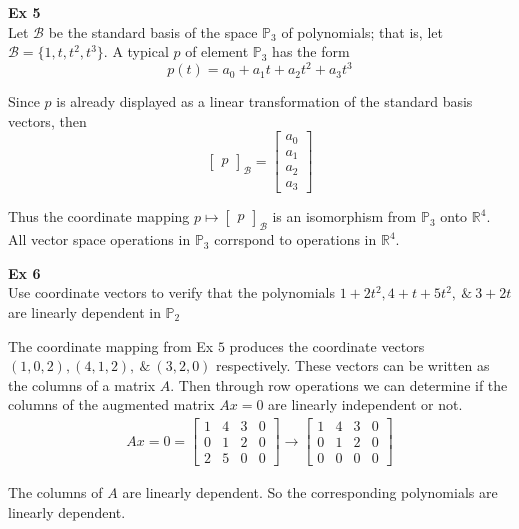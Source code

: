 \documentclass{article}
\begin{document}
   \textbf{Ex 5}\\
   Let $ \mathcal{B} $ be the standard basis of the space $ \mathbb{P}_3 $ of polynomials; that is, let $ \mathcal{B}=\{ 1,t,t^{2},t^{3} \} $. A typical $ p $ of element $ \mathbb{P}_3 $ has the form
   \[
     p(t)=a_0+a_1t+a_2t^{2}+a_3t^{3}
   \]

   Since $ p $ is already displayed as a linear transformation of the standard basis vectors, then
   \[
     \begin{bmatrix}
       p
     \end{bmatrix}_\mathcal{B}=\begin{bmatrix}
       a_0\\
       a_1\\
       a_2\\
       a_3
     \end{bmatrix}
   \]

   Thus the coordinate mapping $ p \mapsto \begin{bmatrix}
     p
   \end{bmatrix}_\mathcal{B} $ is an isomorphism from $ \mathbb{P}_3 $ onto $ \mathbb{R}^{4} $. All vector space operations in $ \mathbb{P}_3 $ corrspond to operations in $ \mathbb{R}^{4} $. 
   
   \textbf{Ex 6}\\
   Use coordinate vectors to verify that the polynomials $ 1+2t^{2},4+t+5t^{2}, ~\&~ 3+2t $ are linearly dependent in $ \mathbb{P}_2 $

   The coordinate mapping from Ex $ 5 $ produces the coordinate vectors $ (1,0,2),(4,1,2), ~\&~ (3,2,0) $ respectively. These vectors can be written as the columns of a matrix $ A $. Then through row operations we can determine if the columns of the augmented matrix $ Ax=0 $  are linearly independent or not.
   \[
     \begin{gathered}
     Ax=0 = \begin{bmatrix}
       1 &4 &3 &0\\
       0 &1 &2 &0\\
       2 &5 &0 &0
     \end{bmatrix} \to 
     \begin{bmatrix}
       1 &4 &3 &0\\
       0 &1 &2 &0\\
       0 &0 &0 &0
     \end{bmatrix}
     \end{gathered}
   \]

   The columns of $ A $ are linearly dependent. So the corresponding polynomials are linearly dependent.
\end{document}
